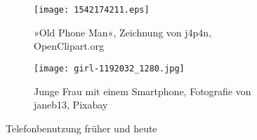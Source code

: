 \documentclass{scrartcl}
\begin{document}
\blindtext

\begin{figure}[h]

\begin{subfigure}[b]{.5\textwidth}
\texttt{[image: 1542174211.eps]}
\caption{»Old Phone Man«, Zeichnung von j4p4n, OpenClipart.org}
\end{subfigure}
\quad %
\begin{subfigure}[b]{.5\textwidth}
\centering
\texttt{[image: girl-1192032\_1280.jpg]}
\caption{Junge Frau mit einem Smartphone, Fotografie von janeb13, Pixabay}
\end{subfigure}

\caption{Telefonbenutzung früher und heute}
\end{figure}

\blindtext
\end{document}
